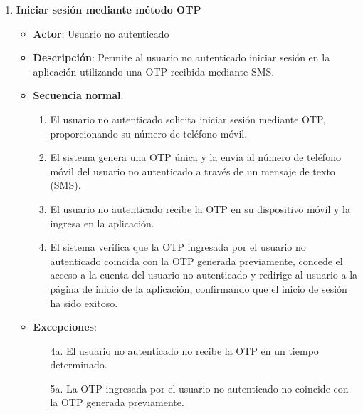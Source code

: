 \begin{enumerate}[label=UC-\protect\twodigits{\arabic*}:, align=left, leftmargin=*]
\item \textbf{Iniciar sesión mediante método OTP}
\begin{itemize}
\item \textbf{Actor}: Usuario no autenticado
\item \textbf{Descripción}: Permite al usuario no autenticado iniciar sesión en la aplicación utilizando una OTP recibida mediante SMS.
\item \textbf{Secuencia normal}:
\begin{enumerate}[label={\arabic*}:]
\item El usuario no autenticado solicita iniciar sesión mediante OTP, proporcionando su número de teléfono móvil.
\item El sistema genera una OTP única y la envía al número de teléfono móvil del usuario no autenticado a través de un mensaje de texto (SMS).
\item El usuario no autenticado recibe la OTP en su dispositivo móvil y la ingresa en la aplicación.
\item El sistema verifica que la OTP ingresada por el usuario no autenticado coincida con la OTP generada previamente, concede el acceso a la cuenta del usuario no autenticado y redirige al usuario a la página de inicio de la aplicación, confirmando que el inicio de sesión ha sido exitoso.
\end{enumerate}
\item \textbf{Excepciones}:
\begin{itemize}
\item[4a.] El usuario no autenticado no recibe la OTP en un tiempo determinado.
\item[5a.] La OTP ingresada por el usuario no autenticado no coincide con la OTP generada previamente.
\end{itemize}
\end{itemize}


\end{enumerate}
